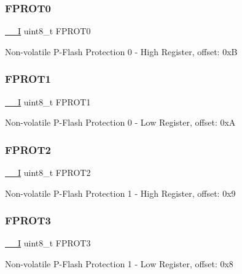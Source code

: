 \subsubsection{\texorpdfstring{FPROT0}{FPROT0}}
{\footnotesize\ttfamily \mbox{\hyperlink{core__cm0plus_8h_af63697ed9952cc71e1225efe205f6cd3}{\+\_\+\+\_\+I}} uint8\+\_\+t F\+P\+R\+O\+T0}

Non-\/volatile P-\/\+Flash Protection 0 -\/ High Register, offset\+: 0xB \mbox{\label{struct_n_v___type_ae00ef9e85bce41b17b8c85e226bfeadb}} 
\subsubsection{\texorpdfstring{FPROT1}{FPROT1}}
{\footnotesize\ttfamily \mbox{\hyperlink{core__cm0plus_8h_af63697ed9952cc71e1225efe205f6cd3}{\+\_\+\+\_\+I}} uint8\+\_\+t F\+P\+R\+O\+T1}

Non-\/volatile P-\/\+Flash Protection 0 -\/ Low Register, offset\+: 0xA \mbox{\label{struct_n_v___type_ae87543688ebb5c30285916eaa270c014}} 
\subsubsection{\texorpdfstring{FPROT2}{FPROT2}}
{\footnotesize\ttfamily \mbox{\hyperlink{core__cm0plus_8h_af63697ed9952cc71e1225efe205f6cd3}{\+\_\+\+\_\+I}} uint8\+\_\+t F\+P\+R\+O\+T2}

Non-\/volatile P-\/\+Flash Protection 1 -\/ High Register, offset\+: 0x9 \mbox{\label{struct_n_v___type_ae95f76fe298558644b1a5c8acc1cdf3a}} 
\subsubsection{\texorpdfstring{FPROT3}{FPROT3}}
{\footnotesize\ttfamily \mbox{\hyperlink{core__cm0plus_8h_af63697ed9952cc71e1225efe205f6cd3}{\+\_\+\+\_\+I}} uint8\+\_\+t F\+P\+R\+O\+T3}

Non-\/volatile P-\/\+Flash Protection 1 -\/ Low Register, offset\+: 0x8 \mbox{\label{struct_n_v___type_a9c289cf99054de8442c0847062613f18}} 
